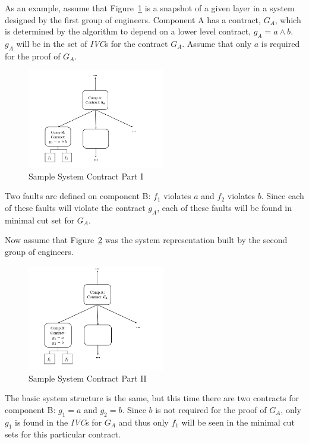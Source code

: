 As an example, assume that Figure~\ref{fig:probComp1} is a snapshot of a given layer in a system designed by the first group of engineers. Component A has a contract, $G_A$, which is determined by the \aivcalg algorithm to depend on a lower level contract, $g_A = a \land b$. $g_A$ will be in the set of \textit{IVC}s for the contract $G_A$. Assume that only $a$ is required for the proof of $G_A$. 

\begin{figure}[h]
\begin{center}
\includegraphics[width=6cm]{images/probComp1.PNG}
\caption{Sample System Contract Part I} \label{fig:probComp1}
\end{center}
\end{figure}

Two faults are defined on component B: $f_1$ violates $a$ and $f_2$ violates $b$. Since each of these faults will violate the contract $g_A$, each of these faults will be found in minimal cut set for $G_A$.

Now assume that Figure~\ref{fig:probComp2} was the system representation built by the second group of engineers. 
\begin{figure}[h]
\begin{center}
\includegraphics[width=6cm]{images/probComp2.PNG}
\caption{Sample System Contract Part II} \label{fig:probComp2}
\end{center}
\end{figure} 
The basic system structure is the same, but this time there are two contracts for component B: $g_1 = a$ and $g_2 = b$. Since $b$ is not required for the proof of $G_A$, only $g_1$ is found in the \textit{IVC}s for $G_A$ and thus only $f_1$ will be seen in the minimal cut sets for this particular contract. 

